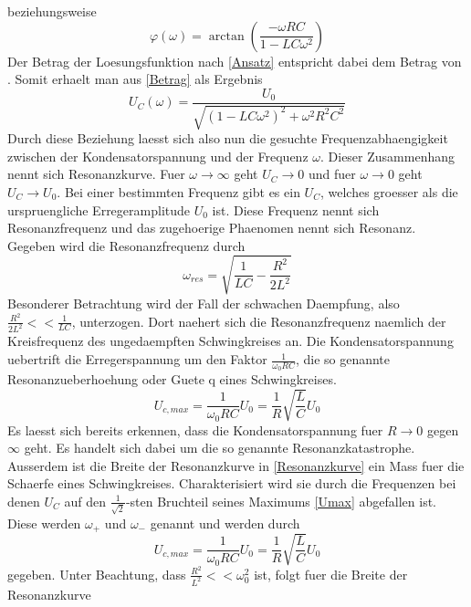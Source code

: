 \documentclass[titlepage=firstcover, captions=tableheading]{scrartcl}
\begin{document}
beziehungsweise
\begin{equation}\label{phi}
    \varphi(\omega)=\arctan(\frac{-\omega RC}{1-LC\omega^2})
\end{equation}
Der Betrag der Loesungsfunktion nach \ref{Ansatz} entspricht dabei dem Betrag von \xi. Somit erhaelt man aus \ref{Betrag} als Ergebnis
\begin{equation} \label{Resonanzkurve}
    U_C(\omega)=\frac{U_0}{\sqrt{(1-LC\omega^2)^2+\omega^2R^2C^2}}
\end{equation}
Durch diese Beziehung laesst sich also nun die gesuchte Frequenzabhaengigkeit zwischen der Kondensatorspannung und der Frequenz $\omega$. Dieser Zusammenhang nennt sich Resonanzkurve. Fuer $\omega\rightarrow\infty$ geht $U_C\rightarrow 0$ und fuer $\omega\rightarrow 0$ geht $U_C\rightarrow U_0$. Bei einer bestimmten Frequenz gibt es ein $U_C$, welches groesser als die urspruengliche Erregeramplitude $U_0$ ist. Diese Frequenz nennt sich Resonanzfrequenz und das zugehoerige Phaenomen nennt sich Resonanz. Gegeben wird die Resonanzfrequenz durch
\begin{equation}
    \omega_{res}=\sqrt{\frac{1}{LC}-\frac{R^2}{2L^2}} 
\end{equation}
Besonderer Betrachtung wird der Fall der schwachen Daempfung, also $\frac{R^2}{2L^2}<<\frac{1}{LC}$, unterzogen. Dort naehert sich die Resonanzfrequenz naemlich der Kreisfrequenz des ungedaempften Schwingkreises an. Die Kondensatorspannung uebertrift die Erregerspannung um den Faktor $\frac{1}{\omega_0RC}$, die so genannte Resonanzueberhoehung oder Guete q eines Schwingkreises.
\begin{equation}\label{Umax}
    U_{c,max}=\frac{1}{\omega_0RC}U_0=\frac{1}{R}\sqrt{\frac{L}{C}}U_0 
\end{equation}
Es laesst sich bereits erkennen, dass die Kondensatorspannung fuer $R\rightarrow 0$ gegen $\infty$ geht. Es handelt sich dabei um die so genannte Resonanzkatastrophe. Ausserdem ist die Breite der Resonanzkurve in \ref{Resonanzkurve} ein Mass fuer die Schaerfe eines Schwingkreises. Charakterisiert wird sie durch die Frequenzen bei denen $U_C$ auf den $\frac{1}{\sqrt{2}}$-sten Bruchteil seines Maximums \ref{Umax} abgefallen ist. Diese werden $\omega_+$ und $\omega_-$ genannt und werden durch 
\begin{equation}
    U_{c,max}=\frac{1}{\omega_0RC}U_0=\frac{1}{R}\sqrt{\frac{L}{C}}U_0 \nonumber
\end{equation}
gegeben. Unter Beachtung, dass $\frac{R^2}{L^2}<<\omega_0^2$ ist, folgt fuer die Breite der Resonanzkurve
\end{document}
